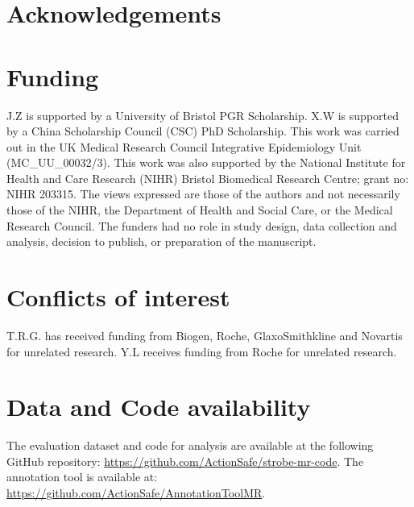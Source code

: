 
\section*{Acknowledgements}

\section*{Funding}
J.Z is supported by a University of Bristol PGR Scholarship.
X.W is supported by a China Scholarship Council (CSC) PhD Scholarship.
This work was carried out in the UK Medical Research Council Integrative Epidemiology Unit (MC\_UU\_00032/3).
This work was also supported by the National Institute for Health and Care Research (NIHR) Bristol Biomedical Research Centre; grant no: NIHR 203315. The views expressed are those of the authors and not necessarily those of the NIHR, the Department of Health and Social Care, or the Medical Research Council. The funders had no role in study design, data collection and analysis, decision to publish, or preparation of the manuscript.


\section*{Conflicts of interest}
T.R.G. has received funding from Biogen, Roche, GlaxoSmithkline and Novartis for unrelated research.
Y.L receives funding from Roche for unrelated research.

\section*{Data and Code availability}

The evaluation dataset and code for analysis are available at the following GitHub repository: \url{https://github.com/ActionSafe/strobe-mr-code}.
The annotation tool is available at: \url{https://github.com/ActionSafe/AnnotationToolMR}.